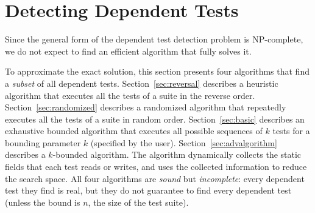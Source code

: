 \section{Detecting Dependent Tests}
\label{sec:detecting}

\newcommand{\smalltrialnum}{10\xspace}
\newcommand{\mediumtrialnum}{100\xspace}
\newcommand{\trialnum}{1000\xspace}

\newcommand{\testlist}[0]{\ensuremath{T^k_i}}
\newcommand{\executeTestsInOrder}[1]{\result{#1}{\env_0}}

Since the general form of the dependent test detection problem is
NP-complete, we do not expect to find an efficient algorithm
that fully solves it.

To approximate the exact solution, this section
presents four algorithms that find a \textit{subset} of
all dependent tests.
Section~\ref{sec:reversal} describes a heuristic algorithm
that executes all the tests of a suite in the reverse order.
Section~\ref{sec:randomized} describes a randomized algorithm
that repeatedly executes all the tests of a suite in random order.
Section~\ref{sec:basic} describes an exhaustive bounded algorithm that
executes all possible sequences of $k$ tests for a bounding parameter $k$
(specified by the user).
Section~\ref{sec:advalgorithm} describes a \dependenceaware{} $k$-bounded algorithm.
The \dependenceaware{} algorithm dynamically collects the
static fields that each test
reads or writes, and uses the collected information to reduce the search space.
All four algorithms are \textit{sound} but \textit{incomplete}:
every dependent test they find is real, but they do not
guarantee to find every dependent test (unless the bound is $n$,
the size of the test suite).


